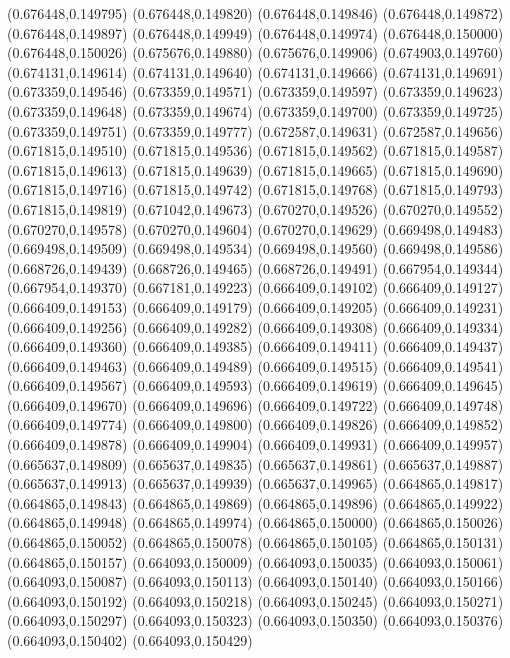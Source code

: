 (0.676448,0.149795)
(0.676448,0.149820)
(0.676448,0.149846)
(0.676448,0.149872)
(0.676448,0.149897)
(0.676448,0.149949)
(0.676448,0.149974)
(0.676448,0.150000)
(0.676448,0.150026)
(0.675676,0.149880)
(0.675676,0.149906)
(0.674903,0.149760)
(0.674131,0.149614)
(0.674131,0.149640)
(0.674131,0.149666)
(0.674131,0.149691)
(0.673359,0.149546)
(0.673359,0.149571)
(0.673359,0.149597)
(0.673359,0.149623)
(0.673359,0.149648)
(0.673359,0.149674)
(0.673359,0.149700)
(0.673359,0.149725)
(0.673359,0.149751)
(0.673359,0.149777)
(0.672587,0.149631)
(0.672587,0.149656)
(0.671815,0.149510)
(0.671815,0.149536)
(0.671815,0.149562)
(0.671815,0.149587)
(0.671815,0.149613)
(0.671815,0.149639)
(0.671815,0.149665)
(0.671815,0.149690)
(0.671815,0.149716)
(0.671815,0.149742)
(0.671815,0.149768)
(0.671815,0.149793)
(0.671815,0.149819)
(0.671042,0.149673)
(0.670270,0.149526)
(0.670270,0.149552)
(0.670270,0.149578)
(0.670270,0.149604)
(0.670270,0.149629)
(0.669498,0.149483)
(0.669498,0.149509)
(0.669498,0.149534)
(0.669498,0.149560)
(0.669498,0.149586)
(0.668726,0.149439)
(0.668726,0.149465)
(0.668726,0.149491)
(0.667954,0.149344)
(0.667954,0.149370)
(0.667181,0.149223)
(0.666409,0.149102)
(0.666409,0.149127)
(0.666409,0.149153)
(0.666409,0.149179)
(0.666409,0.149205)
(0.666409,0.149231)
(0.666409,0.149256)
(0.666409,0.149282)
(0.666409,0.149308)
(0.666409,0.149334)
(0.666409,0.149360)
(0.666409,0.149385)
(0.666409,0.149411)
(0.666409,0.149437)
(0.666409,0.149463)
(0.666409,0.149489)
(0.666409,0.149515)
(0.666409,0.149541)
(0.666409,0.149567)
(0.666409,0.149593)
(0.666409,0.149619)
(0.666409,0.149645)
(0.666409,0.149670)
(0.666409,0.149696)
(0.666409,0.149722)
(0.666409,0.149748)
(0.666409,0.149774)
(0.666409,0.149800)
(0.666409,0.149826)
(0.666409,0.149852)
(0.666409,0.149878)
(0.666409,0.149904)
(0.666409,0.149931)
(0.666409,0.149957)
(0.665637,0.149809)
(0.665637,0.149835)
(0.665637,0.149861)
(0.665637,0.149887)
(0.665637,0.149913)
(0.665637,0.149939)
(0.665637,0.149965)
(0.664865,0.149817)
(0.664865,0.149843)
(0.664865,0.149869)
(0.664865,0.149896)
(0.664865,0.149922)
(0.664865,0.149948)
(0.664865,0.149974)
(0.664865,0.150000)
(0.664865,0.150026)
(0.664865,0.150052)
(0.664865,0.150078)
(0.664865,0.150105)
(0.664865,0.150131)
(0.664865,0.150157)
(0.664093,0.150009)
(0.664093,0.150035)
(0.664093,0.150061)
(0.664093,0.150087)
(0.664093,0.150113)
(0.664093,0.150140)
(0.664093,0.150166)
(0.664093,0.150192)
(0.664093,0.150218)
(0.664093,0.150245)
(0.664093,0.150271)
(0.664093,0.150297)
(0.664093,0.150323)
(0.664093,0.150350)
(0.664093,0.150376)
(0.664093,0.150402)
(0.664093,0.150429)
